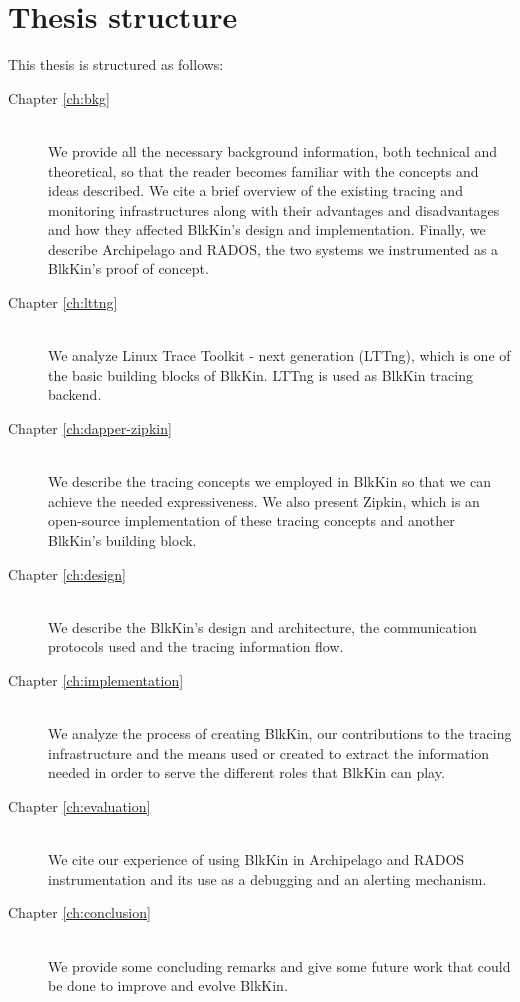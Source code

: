 \section{Thesis structure} 
This thesis is structured as follows:

\begin{description}
\item[Chapter \ref{ch:bkg}] \hfill \\
We provide all the necessary background information, both technical and
theoretical, so that the reader becomes familiar with the concepts and ideas
described. We cite a brief overview of the existing tracing and monitoring
infrastructures along with their advantages and disadvantages and how they
affected BlkKin's design and implementation. Finally, we describe Archipelago
and RADOS, the two systems we instrumented as a BlkKin's proof of concept.

\item[Chapter \ref{ch:lttng}] \hfill \\
We analyze Linux Trace Toolkit - next generation (LTTng), which is one of the
basic building blocks of BlkKin. LTTng is used as BlkKin tracing backend.

\item[Chapter \ref{ch:dapper-zipkin}] \hfill \\
We describe the tracing concepts we employed in BlkKin so that we can achieve
the needed expressiveness. We also present Zipkin, which is an open-source
implementation of these tracing concepts and another BlkKin's building block.

\item[Chapter \ref{ch:design}] \hfill \\
We describe the BlkKin's design and architecture, the communication protocols
used and the tracing information flow.

\item[Chapter \ref{ch:implementation}] \hfill \\
We analyze the process of creating BlkKin, our contributions to the tracing
infrastructure and the means used or created to extract the information needed
in order to serve the different roles that BlkKin can play.

\item[Chapter \ref{ch:evaluation}] \hfill \\
We cite our experience of using BlkKin in Archipelago and RADOS instrumentation
and its use as a debugging and an alerting mechanism.

\item[Chapter \ref{ch:conclusion}] \hfill \\
We provide some concluding remarks and give some future work that could be done
to improve and evolve BlkKin.
\end{description}
